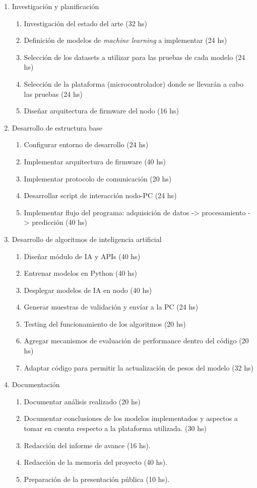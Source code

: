 \documentclass[
11pt, %
codirector, %
]{charter}
\begin{document}
\begin{enumerate}
\item Investigación y planificación
	\begin{enumerate}
	\item Investigación del estado del arte (32 hs)
	\item Definición de modelos de \textit{machine learning} a implementar (24 hs)
	\item Selección de los datasets a utilizar para las pruebas de cada modelo (24 hs)
	\item Selección de la plataforma (microcontrolador) donde se llevarán a cabo las pruebas (24 hs)
	\item Diseñar arquitectura de firmware del nodo (16 hs)
	\end{enumerate}
\item Desarrollo de estructura base
	\begin{enumerate}
	\item Configurar entorno de desarrollo (24 hs)
	\item Implementar arquitectura de firmware (40 hs)
	\item Implementar protocolo de comunicación (20 hs)
	\item Desarrollar script de interacción nodo-PC (24 hs)
	\item Implementar flujo del programa: adquisición de datos -> procesamiento -> predicción (40 hs)
	\end{enumerate}
\item Desarrollo de algoritmos de inteligencia artificial
	\begin{enumerate}
	\item Diseñar módulo de IA y APIs (40 hs)
	\item Entrenar modelos en Python (40 hs)
	\item Desplegar modelos de IA en nodo (40 hs)
	\item Generar muestras de validación y envíar a la PC (24 hs)
	\item Testing del funcionamiento de los algoritmos (20 hs) 
	\item Agregar mecanismos de evaluación de performance dentro del código (20 hs)
	\item Adaptar código para permitir la actualización de pesos del modelo (32 hs) 
	\end{enumerate}
\item Documentación
	\begin{enumerate}
	\item Documentar análisis realizado (20 hs)
	\item Documentar conclusiones de los modelos implementados y aspectos a tomar en cuenta respecto a la plataforma utilizada. (30 hs)
	\item Redacción del informe de avance (16 hs).
	\item Redacción de la memoria del proyecto (40 hs).
	\item Preparación de la presentación pública (10 hs).
	\end{enumerate}
\end{enumerate}
\end{document}
